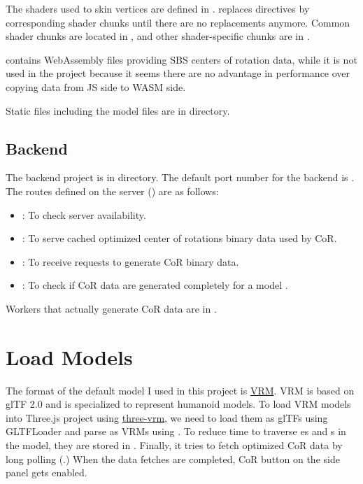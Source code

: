 \documentclass{homework}
\begin{document}
The shaders used to skin vertices are defined in .   replaces  directives by corresponding shader chunks until there are no replacements anymore. Common shader chunks are located in , and other shader-specific chunks are in .

 contains WebAssembly files providing SBS centers of rotation data, while it is not used in the project because it seems there are no advantage in performance over copying data from JS side to WASM side.

Static files including the model files are in  directory.

\subsection{Backend}
The backend project is in  directory. The default port number for the backend is . The routes defined on the server () are as follows:
\begin{itemize}
    \item [] : To check server availability.
    \item [] : To serve cached optimized center of rotations binary data used by CoR.
    \item [] : To receive requests to generate CoR binary data.
    \item [] : To check if CoR data are generated completely for a model .
\end{itemize}

Workers that actually generate CoR data are in .

\section{Load Models}
The format of the default model I used in this project is \href{https://vrm.dev/}{VRM}. VRM is based on glTF 2.0 and is specialized to represent humanoid models. To load VRM models into Three.js project using \href{https://github.com/pixiv/three-vrm}{three-vrm}, we need to load them as glTFs using GLTFLoader  and parse as VRMs using . To reduce time to traverse es and s in the model, they are stored in . Finally, it tries to fetch optimized CoR data by long polling (.) When the data fetches are completed, CoR button on the side panel gets enabled.
\end{document}
